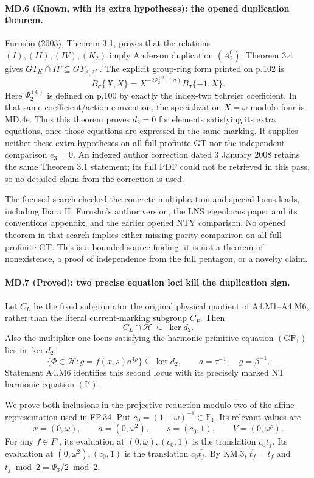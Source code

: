 \paragraph{MD.6 (Known, with its extra hypotheses): the opened duplication theorem.}
Furusho (2003), Theorem 3.1, proves that the relations
$(I),(II),(IV),(K_2)$ imply Anderson duplication $(A_2^0)$;
Theorem 3.4 gives $GT_K\cap I\Gamma\subseteq GT_{A,2^\infty}$.
The explicit group-ring form printed on p.102 is
\[
 B_\sigma\{X,X\}
   =X^{-2\Psi_2^{(0)}(\sigma)}B_\sigma\{-1,X\}.
\]
Here $\Psi_2^{(0)}$ is defined on p.100 by exactly the
index-two Schreier coefficient. In that same coefficient/action
convention, the specialization $X=\omega$ modulo four is
MD.4e. Thus this theorem proves $d_2=0$ for elements satisfying
its extra equations, once those equations are expressed in the
same marking. It supplies neither these extra hypotheses on
all full profinite GT nor the independent comparison $e_3=0$.
An indexed author correction dated 3 January 2008 retains the
same Theorem 3.1 statement; its full PDF could not be retrieved
in this pass, so no detailed claim from the correction is used.

The focused search checked the concrete multiplication and
special-locus leads, including Ihara II, Furusho's author version,
the LNS eigenlocus paper and its conventions appendix, and the
earlier opened NTY comparison. No opened theorem in that search
implies either missing parity comparison on all full profinite GT.
This is a bounded source finding; it is not a theorem of
nonexistence, a proof of independence from the full pentagon,
or a novelty claim.

\paragraph{MD.7 (Proved): two precise equation loci kill the duplication sign.}
Let $C_L$ be the fixed subgroup for the original physical quotient
of A4.M1--A4.M6, rather than the literal current-marking subgroup $C_P$.
Then
\[
 C_L\cap\mathcal H\ \subseteq\ \ker d_2.
 \tag{MD.7a}
\]
Also the multiplier-one locus satisfying the harmonic primitive
equation $(\mathrm{GF}_1)$ lies in $\ker d_2$:
\[
 \{\Phi\in\mathcal H:g=f(x,s)a^{4\rho}\}\subseteq\ker d_2,
 \qquad a=\tau^{-1},\quad g=\beta^{-1}.
 \tag{MD.7b}
\]
Statement A4.M6 identifies this second locus with its precisely marked
NT harmonic equation $(\mathrm I')$.

We prove both inclusions in the projective reduction modulo two
of the affine representation used in FP.34. Put
$c_0=(1-\omega)^{-1}\in\mathbb F_4$. Its relevant values are
\[
 x=(0,\omega),\qquad a=(0,\omega^2),\qquad
 s=(c_0,1),\qquad V=(0,\omega^\rho).
\]
For any $f\in F'$, its evaluation at
$(0,\omega),(c_0,1)$ is the translation $c_0t_f$.
Its evaluation at $(0,\omega^2),(c_0,1)$ is the translation
$c_0\overline{t_f}$. By KM.3, $\overline{t_f}=t_f$ and
$t_f\bmod2=\Psi_3/2\bmod2$.

